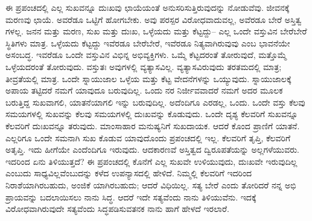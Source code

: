 ಈ ಪ್ರಪಂಚದಲ್ಲಿ ಎಲ್ಲ ಸುಖವನ್ನೂ ದುಃಖವು ಛಾಯೆಯಂತೆ ಅನುಸರಿಸುತ್ತಿರುವುದನ್ನು ನೋಡುವೆವು. ಜೀವನಕ್ಕೆ ಮರಣವು ಛಾಯೆ. ಅವರೆಡೂ ಒಟ್ಟಿಗೆ ಹೋಗಬೇಕು. ಅವು ಪರಸ್ಪರ ವಿರೋಧವಾದುವಲ್ಲ, ಅವೆರಡೂ ಬೇರೆ ಅಸ್ತಿತ್ವ ಗಳಲ್ಲ. ಜನನ ಮತ್ತು ಮರಣ, ಸುಖ ಮತ್ತು ದುಃಖ, ಒಳ್ಳೆಯದು ಮತ್ತು ಕೆಟ್ಟದ್ದು– ಎಲ್ಲ ಒಂದೇ ವಸ್ತುವಿನ ಬೇರೆಬೇರೆ ಸ್ಥಿತಿಗಳು ಮಾತ್ರ. ಒಳ್ಳೆಯದು ಕೆಟ್ಟದ್ದು ಇವೆರಡೂ ಬೇರೆಬೇರೆ, ಇವೆರಡೂ ನಿತ್ಯವಾಗಿರುವುವು ಎಂಬ ಭಾವನೆಯೇ ಅಸಂಬದ್ಧ. ಇವರೆಡೂ ಒಂದೇ ವಸ್ತುವಿನ ವಿಭಿನ್ನ ಅಭಿವ್ಯಕ್ತಿಗಳು. ಒಮ್ಮೆ ಕೆಟ್ಟದರಂತೆ ತೋರುವುದೆ, ಮತ್ತೊಮ್ಮೆ ಒಳ್ಳೆಯದರಂತೆ ತೋರುವುದು. ವಸ್ತುತಃ ಅವುಗಳಲ್ಲಿ ವ್ಯತ್ಯಾಸವಿಲ್ಲ. ವ್ಯತ್ಯಾಸವಿರುವುದು ತರತಮದಲ್ಲಿ ಮಾತ್ರ; ತೀವ್ರತೆಯಲ್ಲಿ ಮಾತ್ರ. ಒಂದೇ ಸ್ನಾಯುಜಾಲ ಒಳ್ಳೆಯ ಮತ್ತು ಕೆಟ್ಟ ವೇದನೆಗಳನ್ನು ಒಯ್ಯುವುದು. ಸ್ನಾಯುಜಾಲಕ್ಕೆ ಅಪಾಯ ತಟ್ಟಿದರೆ ನಮಗೆ ಯಾವುದೂ ಬರುವುದಿಲ್ಲ. ಒಂದು ನರ ನಿರ್ಜೀವವಾದರೆ ನಮಗೆ ಅದರ ಮೂಲಕ ಬರುತ್ತಿದ್ದ ಸುಖವಾಗಲಿ, ಯಾತನೆಯಾಗಲಿ ಇನ್ನು ಬರುವುದಿಲ್ಲ. ಅದೆಂದಿಗೂ ಎರಡಲ್ಲ, ಒಂದು. ಒಂದೇ ವಸ್ತು ಕೆಲವು ಸಮಯಗಳಲ್ಲಿ ಸುಖವನ್ನು ಕೆಲವು ಸಮಯಗಳಲ್ಲಿ ದುಃಖವನ್ನು ಕೊಡುವುದು. ಒಂದೇ ದೃಶ್ಯ ಕೆಲವರಿಗೆ ಸುಖವನ್ನೂ ಕೆಲವರಿಗೆ ದುಃಖವನ್ನೂ ತರುವುದು. ಮಾಂಸಾಹಾರ ಮನುಷ್ಯನಿಗೆ ಸುಖದಾಯಕ. ಆದರೆ ಕೊಂದ ಪ್ರಾಣಿಗೆ ಯಾತನೆ. ಎಲ್ಲರಿಗೂ ಒಂದೇ ಸಮನಾಗಿ ಸುಖ ಕೊಡುವ ಯಾವುದೊಂದು ಪ್ರಪಂಚದಲ್ಲಿ ಇಲ್ಲ. ಕೆಲವರಿಗೆ ತೃಪ್ತಿ, ಕೆಲವರಿಗೆ ಅತೃಪ್ತಿ. ಇದು ಹೀಗೆಯೇ ಎಂದೆಂದಿಗೂ ಇರುವುದು. ಆದಕಾರಣವೆ ಅಸ್ತಿತ್ವದ ದ್ವಿರೂಪತೆಯನ್ನು ಅಲ್ಲಗಳೆಯುವರು. ಇದರಿಂದ ಏನು ತಿಳಿಯುತ್ತದೆ? ಈ ಪ್ರಪಂಚದಲ್ಲಿ ಕೊನೆಗೆ ಎಲ್ಲ ಸುಖವೇ ಉಳಿಯುವುದು, ದುಃಖವೇ ಇರುವುದಿಲ್ಲ ಎಂಬುದು ಸಾಧ್ಯವಿಲ್ಲವೆಂಬುದನ್ನು ಕಳೆದ ಉಪನ್ಯಾಸದಲ್ಲಿ ಹೇಳಿದೆ. ನಿಮ್ಮಲ್ಲಿ ಕೆಲವರಿಗೆ ಇದರಿಂದ ನಿರಾಶೆಯಾಗಿರಬಹುದು, ಅಂಜಿಕೆ ಯಾಗಿರಬಹುದು; ಆದರೆ ವಿಧಿಯಿಲ್ಲ. ಸತ್ಯ ಬೇರೆ ಎಂದು ತೋರಿದರೆ ನನ್ನ ಅಭಿ ಪ್ರಾಯವನ್ನು ಬದಲಾಯಿಸಲು ನಾನು ಸಿದ್ಧ. ಆದರೆ ಇದೇ ಸತ್ಯವೆಂದು ನಾನು ತಿಳಿಯುವೆನು. ಇದಕ್ಕೆ ವಿರೋಧವಾಗಿರುವುದೇ ಸತ್ಯವೆಂದು ಸಿದ್ಧಪಡಿಸುವತನಕ ನಾನು ಹಾಗೆ ಹೇಳದೆ ಇರಲಾರೆ.

